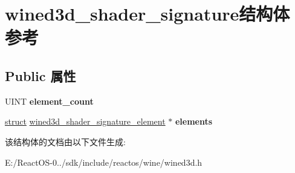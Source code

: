 \hypertarget{structwined3d__shader__signature}{}\section{wined3d\+\_\+shader\+\_\+signature结构体 参考}
\label{structwined3d__shader__signature}
\subsection*{Public 属性}
\begin{DoxyCompactItemize}
\item 
\mbox{\label{structwined3d__shader__signature_ab4ac6d863a528dc36d0b5b6d5439b363}} 
U\+I\+NT {\bfseries element\+\_\+count}
\item 
\mbox{\label{structwined3d__shader__signature_adb5ed988649792f8cf73bba481fc4a1e}} 
\hyperlink{interfacestruct}{struct} \hyperlink{structwined3d__shader__signature__element}{wined3d\+\_\+shader\+\_\+signature\+\_\+element} $\ast$ {\bfseries elements}
\end{DoxyCompactItemize}


该结构体的文档由以下文件生成\+:\begin{DoxyCompactItemize}
\item 
E\+:/\+React\+O\+S-\/0../sdk/include/reactos/wine/wined3d.\+h\end{DoxyCompactItemize}
